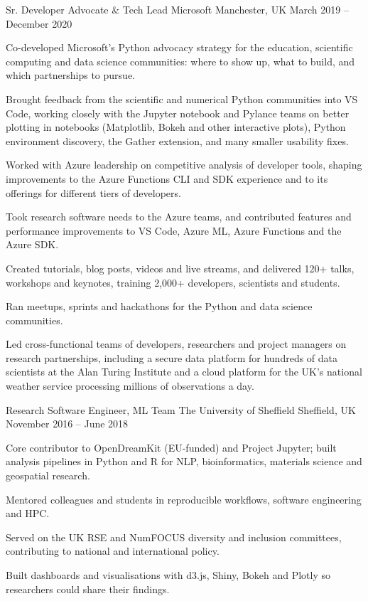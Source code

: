 \begin{cventries}
\cventry
{Sr. Developer Advocate \& Tech Lead}
{Microsoft}
{Manchester, UK}
{March 2019 -- December 2020}
{
\begin{cvitems}
  \item {Co-developed Microsoft's Python advocacy strategy for the education, scientific computing and data science communities: where to show up, what to build, and which partnerships to pursue.}
  \item {Brought feedback from the scientific and numerical Python communities into VS Code, working closely with the Jupyter notebook and Pylance teams on better plotting in notebooks (Matplotlib, Bokeh and other interactive plots), Python environment discovery, the Gather extension, and many smaller usability fixes.}
  \item {Worked with Azure leadership on competitive analysis of developer tools, shaping improvements to the Azure Functions CLI and SDK experience and to its offerings for different tiers of developers.}
  \item {Took research software needs to the Azure teams, and contributed features and performance improvements to VS Code, Azure ML, Azure Functions and the Azure SDK.}
  \item {Created tutorials, blog posts, videos and live streams, and delivered 120+ talks, workshops and keynotes, training 2,000+ developers, scientists and students.}
  \item {Ran meetups, sprints and hackathons for the Python and data science communities.}
  \item {Led cross-functional teams of developers, researchers and project managers on research partnerships, including a secure data platform for hundreds of data scientists at the Alan Turing Institute and a cloud platform for the UK's national weather service processing millions of observations a day.}
\end{cvitems}
}




\cventry
{Research Software Engineer, ML Team}
{The University of Sheffield}
{Sheffield, UK}
{November 2016 -- June 2018}
{
\begin{cvitems}
  \item {Core contributor to OpenDreamKit (EU-funded) and Project Jupyter; built analysis pipelines in Python and R for NLP, bioinformatics, materials science and geospatial research.}
  \item {Mentored colleagues and students in reproducible workflows, software engineering and HPC.}
  \item {Served on the UK RSE and NumFOCUS diversity and inclusion committees, contributing to national and international policy.}
  \item {Built dashboards and visualisations with d3.js, Shiny, Bokeh and Plotly so researchers could share their findings.}
\end{cvitems}
}



\end{cventries}
